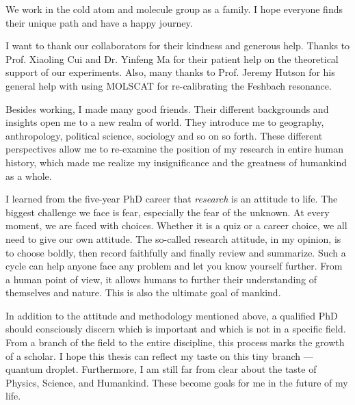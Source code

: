 We work in the cold atom and molecule group as a family. I hope everyone finds their unique path and have a happy journey.

I want to thank our collaborators for their kindness and generous help. Thanks to Prof. Xiaoling Cui and Dr. Yinfeng Ma for their patient help on the theoretical support of our experiments. Also, many thanks to Prof. Jeremy Hutson for his general help with using MOLSCAT for re-calibrating the Feshbach resonance. 

Besides working, I made many good friends. Their different backgrounds and insights open me to a new realm of world. They introduce me to geography, anthropology, political science, sociology and so on so forth. These different perspectives allow me to re-examine the position of my research in entire human history, which made me realize my insignificance and the greatness of humankind as a whole.

I learned from the five-year PhD career that \textit{research} is an attitude to life. The biggest challenge we face is fear, especially the fear of the unknown. At every moment, we are faced with choices. Whether it is a quiz or a career choice, we all need to give our own attitude. The so-called research attitude, in my opinion, is to choose boldly, then record faithfully and finally review and summarize. Such a cycle can help anyone face any problem and let you know yourself further. From a human point of view, it allows humans to further their understanding of themselves and nature. This is also the ultimate goal of mankind.

In addition to the attitude and methodology mentioned above, a qualified PhD should consciously discern which is important and which is not in a specific field. From a branch of the field to the entire discipline, this process marks the growth of a scholar. I hope this thesis can reflect my taste on this tiny branch --- quantum droplet. Furthermore, I am still far from clear about the taste of Physics, Science, and Humankind. These become goals for me in the future of my life.

